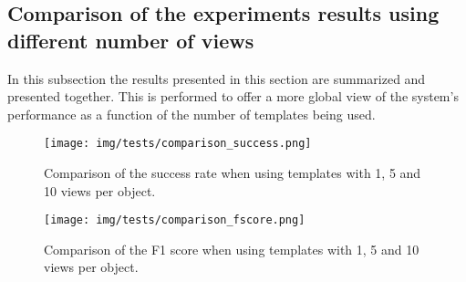 	\subsection{Comparison of the experiments results using different number of views}
	In this subsection the results presented in this section are summarized and presented together. 
	This is performed to offer a more global view of the system's performance as a function of the number of templates being used. 

	\begin{figure}[H]
		\begin{center}
	    \texttt{[image: img/tests/comparison\_success.png]}
		\caption[Comparison of the success rate]{Comparison of the success rate when using templates with 1, 5 and 10 views per object.}
		\label{comparison_success}
		\end{center}
	\end{figure}

	\begin{figure}[H]
		\begin{center}
	    \texttt{[image: img/tests/comparison\_fscore.png]}
		\caption[Comparison of the F1 score]{Comparison of the F1 score when using templates with 1, 5 and 10 views per object.}
		\label{comparison_fscore}
		\end{center}
	\end{figure}